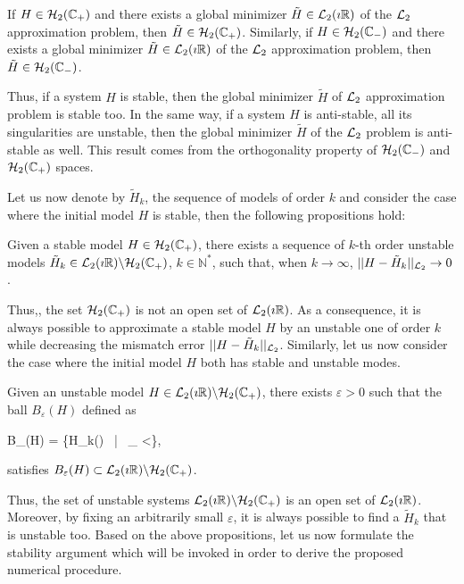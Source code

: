 \documentclass[graybox]{svmult}
\begin{document}
\begin{proposition} \label{propStability:ortho}
	If $H\in {\mathcal{H}_{2}}(\mathbb{C}_+)$ and there exists a global minimizer $\tilde H\in {\mathcal{L}_{2}}(\imath\mathbb{R})$ of the ${\mathcal{L}_{2}}$ approximation problem, then $\tilde H\in {\mathcal{H}_{2}}(\mathbb{C}_+)$. 
	Similarly, if $H\in {\mathcal{H}_{2}}(\mathbb{C}_-)$ and there exists a global minimizer $\tilde H\in {\mathcal{L}_{2}}(\imath\mathbb{R})$ of the ${\mathcal{L}_{2}}$ approximation problem, then $\tilde H\in {\mathcal{H}_{2}}(\mathbb{C}_-)$.
\end{proposition}
Thus, if a system $H$ is stable, then the global minimizer $\tilde H$ of ${\mathcal{L}_{2}}$ approximation problem is stable too. In the same way, if a system $H$ is anti-stable, \ie all its singularities are unstable, then the global minimizer $\tilde H$ of the ${\mathcal{L}_{2}}$ problem is anti-stable as well. This result comes from the orthogonality property of ${\mathcal{H}_{2}}(\mathbb{C}_-)$ and ${\mathcal{H}_{2}}(\mathbb{C}_+)$ spaces. 

Let us now denote by $\tilde H_k$, the sequence of models of order $k$ and consider the case where the initial  model $H$ is stable, then the following propositions hold:

\begin{proposition} \label{propStability:stable}
	Given a stable model $H\in  {\mathcal{H}_{2}}(\mathbb{C_+})$, there exists a sequence of $k$-th order unstable models $\tilde H_k\in {\mathcal{L}_{2}}(\imath\mathbb{R})\backslash {\mathcal{H}_{2}}(\mathbb{C}_+)$, $k\in \mathbb{N}^*$, such that, when $k\rightarrow \infty$,
	$|| H-\tilde H_k ||_{{\mathcal{L}_{2}}} \rightarrow 0$.
\end{proposition}
Thus,, the set ${\mathcal{H}_{2}}(\mathbb{C}_+)$ is not an open set of ${\mathcal{L}_{2}}(\imath\mathbb{R})$. As a consequence, it is always possible to approximate a stable model $H$ by an unstable one of order $k$ while decreasing the mismatch error $|| H -\tilde H_k ||_{{\mathcal{L}_{2}}}$. Similarly, let us now consider the case where the initial model $H$ both has stable and unstable modes. 

\begin{proposition} \label{propStability:unstable}
	Given an unstable model $H\in {\mathcal{L}_{2}}(\imath\mathbb{R})\backslash {\mathcal{H}_{2}}(\mathbb{C}_+)$, there exists $\varepsilon>0$ such that the ball $B_{\varepsilon}(H)$ defined as 
	\begin{eq}
		B_{\varepsilon}(H)  = \Big\{\tilde H_k\in \Ltwo(\imath\Real)~ \big|~ _{\Ltwo} <\varepsilon \Big\},
	\end{eq}
	satisfies $B_{\varepsilon}(H)\subset {\mathcal{L}_{2}}(\imath\mathbb{R})\backslash {\mathcal{H}_{2}}(\mathbb{C}_+)$.
\end{proposition}
Thus, the set of unstable systems ${\mathcal{L}_{2}}(\imath\mathbb{R})\backslash {\mathcal{H}_{2}}(\mathbb{C}_+)$ is an open set of ${\mathcal{L}_{2}}(\imath\mathbb{R})$. Moreover, by fixing an arbitrarily small $\varepsilon$, it is always possible to find a $\tilde H_k$ that is unstable too. Based on the above propositions, let us now formulate the stability argument which will be invoked in order to derive the proposed numerical procedure.
\end{document}
